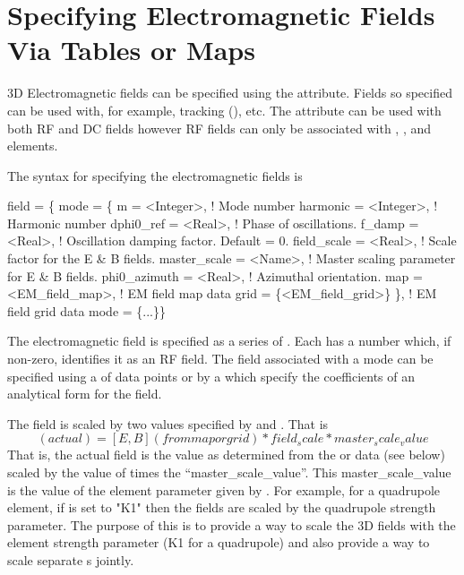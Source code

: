\section{Specifying Electromagnetic Fields Via Tables or Maps}
\label{s:em.fields}

3D Electromagnetic fields can be specified using the 
attribute. Fields so specified can be used with, for example,
 tracking (), etc. The 
attribute can be used with both RF and DC fields however RF fields can
only be associated with , , and 
elements.

The syntax for specifying the electromagnetic fields is
\begin{example}
  field = \{
    mode = \{
      m             = <Integer>, ! Mode number
      harmonic      = <Integer>, ! Harmonic number 
      dphi0_ref     = <Real>,    ! Phase of oscillations.
      f_damp        = <Real>,    ! Oscillation damping factor. Default = 0.
      field_scale   = <Real>,    ! Scale factor for the E & B fields.
      master_scale  = <Name>,    ! Master scaling parameter for E & B fields.
      phi0_azimuth  = <Real>,    ! Azimuthal orientation.
      map           = <EM_field_map>,        ! EM field map data
      grid          = \{<EM_field_grid>\} \},    ! EM field grid data
    mode = \{...\}\}
\end{example}
The electromagnetic field is specified as a series of . Each
 has a  number which, if non-zero, identifies it
as an RF field. The field associated with a mode can be specified
using a  of data points or by a  which specify the
coefficients of an analytical form for the field.

The field is scaled by two values specified by  and
. That is
\begin{equation}
  [E, B] (actual) = [E, B] (from map or grid) * field_scale * master_scale_value
\end{equation}
That is, the actual field is the value as determined from the 
or  data (see below) scaled by the value of 
times the ``master_scale_value''. This master_scale_value is the value
of the element parameter given by . For example, for
a quadrupole element, if  is set to "K1" then the
fields are scaled by the quadrupole strength parameter. The purpose of
this  is to provide a way to scale the 3D fields with
the element strength parameter (K1 for a quadrupole) and also provide
a way to scale separate s jointly.

